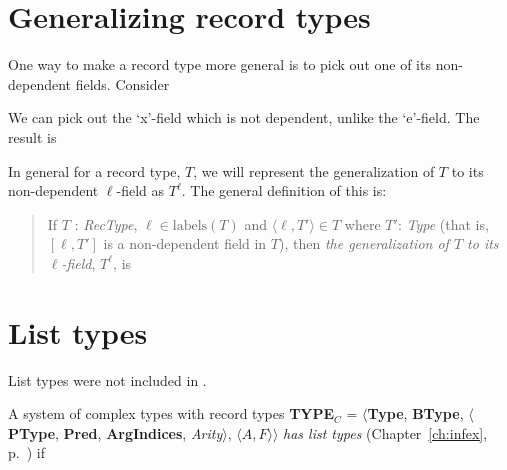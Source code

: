 \section{Generalizing record types}
\label{app:gen-rectypes}

One way to make a record type more general is to pick out one of its
non-dependent fields.  Consider 
\begin{quote}
\end{quote}
We can pick out the `x'-field which is not dependent, unlike the
`e'-field. The result is
\begin{quote}
\end{quote}
In general for a record type,  $T$, we will represent the generalization
of $T$ to its non-dependent $\ell$-field as $T^\ell$.  The general
definition of this is:
\begin{quote}
If $T$ : \textit{RecType}, $\ell\in\text{labels}(T)$ and
$\langle\ell,T'\rangle\in T$ where $T'$: \textit{Type} (that is,
$[\ell,T']$ is a non-dependent field in $T$), then \textit{the
  generalization of $T$ to its $\ell$-field}, $T^\ell$, is
\begin{quote}
\end{quote}
\end{quote}

\section{List types}
\label{app:listtypes}

List types were not included in \cite{Cooper2012}.

A system of complex types with record types {\bf TYPE$_C$} = $\langle${\bf Type}, {\bf BType},
$\langle$\textbf{PType}, {\bf Pred}, \textbf{ArgIndices}, {\it
  Arity\/}$\rangle$, $\langle A,F\rangle$$\rangle$ \textit{has list
  types} (Chapter~\ref{ch:infex}, p.~\pageref{ex:listtypes}) if

